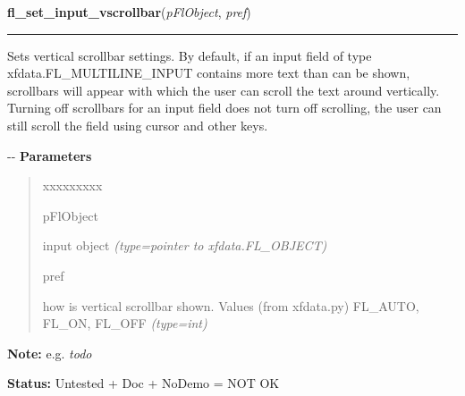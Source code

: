 \hspace{.8\funcindent}\begin{boxedminipage}{\funcwidth}

    \raggedright \textbf{fl\_set\_input\_vscrollbar}(\textit{pFlObject}, \textit{pref})

    \vspace{-1.5ex}

    \rule{\textwidth}{0.5\fboxrule}
\setlength{\parskip}{2ex}

Sets vertical scrollbar settings. By default, if an input field of type
xfdata.FL\_MULTILINE\_INPUT contains more text than can be shown, scrollbars
will appear with which the user can scroll the text around vertically.
Turning off scrollbars for an input field does not turn off scrolling, the
user can still scroll the field using cursor and other keys.

-{}-
\setlength{\parskip}{1ex}
      \textbf{Parameters}
      \vspace{-1ex}

      \begin{quote}
        \begin{Ventry}{xxxxxxxxx}

          \item[pFlObject]


input object
            {\it (type=pointer to xfdata.FL\_OBJECT)}

          \item[pref]


how is vertical scrollbar shown. Values (from xfdata.py) FL\_AUTO,
FL\_ON, FL\_OFF
            {\it (type=int)}

        \end{Ventry}

      \end{quote}

\textbf{Note:} 
e.g. \emph{todo}


\textbf{Status:} 
Untested + Doc + NoDemo = NOT OK


    \end{boxedminipage}

    \label{xformslib:flinput:fl_set_input_topline}

    \vspace{0.5ex}

